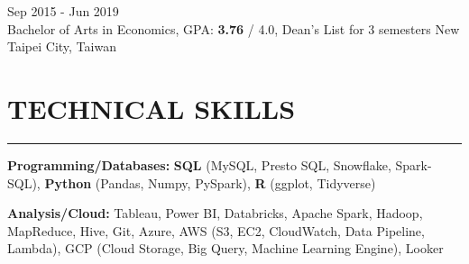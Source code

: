 \documentclass[11pt,letterpaper]{article}
\begin{document}
\vspace{2pt}
 \hfill Sep 2015 - Jun 2019\\[-1pt]
Bachelor of Arts in Economics, GPA: \textbf{3.76} / 4.0, Dean's List for 3 semesters \hfill New Taipei City, Taiwan

\vspace{2pt}
\section*{TECHNICAL SKILLS}
\vspace{-6pt}\noindent\rule{\textwidth}{0.8pt}

\vspace{2pt}
\noindent\textbf{Programming/Databases:} \textbf{SQL} (MySQL, Presto SQL, Snowflake, Spark-SQL), \textbf{Python} (Pandas, Numpy, PySpark), \textbf{R} (ggplot, Tidyverse)

\vspace{2pt}
\noindent\textbf{Analysis/Cloud:} Tableau, Power BI, Databricks, Apache Spark, Hadoop, MapReduce, Hive, Git, Azure, AWS (S3, EC2, CloudWatch, Data Pipeline, Lambda), GCP (Cloud Storage, Big Query, Machine Learning Engine), Looker
\end{document}
